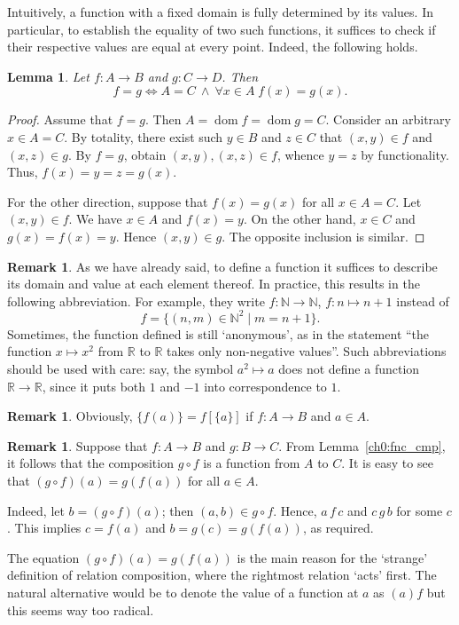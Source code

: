\documentclass[12pt,notitlepage]{article}
\theoremstyle{plain}
\newtheorem{lemma}[thm]{Lemma}
\theoremstyle{definition}
\newtheorem{rem}[thm]{Remark}
\theoremstyle{plain}
\newcommand{\N}{\mathbb{N}}
\newcommand{\R}{\mathbb{R}}
\newcommand{\dom}{\mathop{\mathrm{dom}}}
\newcommand{\1}{\mathbf{1}}
\newcommand{\0}{\mathbf{0}}
\newcommand{\mcomm}[1]{}
\begin{document}
Intuitively, a function with a fixed domain is fully determined by its values. In particular, to establish the equality of two such functions, it suffices to check if their respective values are equal at every point. Indeed, the following holds.
\begin{lemma}\label{ch0:tot_fnc_cmp}
Let $f\colon A \to B$ and $g\colon C \to D$. Then
$$f = g \iff A = C\ \wedge\ \forall x \in A\; f(x) = g(x).$$
\end{lemma}
\begin{proof}
Assume that $f = g$. Then $A = \dom f = \dom g = C$. Consider an arbitrary $x \in A = C$. By totality, there exist such $y \in B$ and $z \in C$ that $(x,y) \in f$ and $(x,z) \in g$. By $f = g$, obtain $(x, y), (x, z) \in f$, whence $y = z$ by functionality. Thus, $f(x) = y = z = g(x)$.

For the other direction, suppose that $f(x) = g(x)$ for all $x \in A = C$. Let $(x,y) \in f$. We have $x \in A$ and $f(x) = y$. On the other hand, $x \in C$ and $g(x) = f(x) = y$. Hence $(x,y) \in g$. The opposite inclusion is similar.
\end{proof}

\begin{rem}
As we have already said, to define a function it suffices to describe its domain and value at each element thereof. In practice, this results in the following abbreviation. For example, they write $f\colon \N \to \N$, $f\colon n \mapsto n + 1$ instead of
$$f = \{(n,m) \in \N^2 \mid m = n + 1 \}.$$
Sometimes, the function defined is still `anonymous', as in the statement ``the function $x \mapsto x^2$ from $\R$ to $\R$ takes only non-negative values''. Such abbreviations should be used with care: say, the symbol  $a^2 \mapsto a$ does not define a function $\R \to \R$, since it puts both $1$ and $-1$ into correspondence to $1$. 
\end{rem}

\begin{rem}
Obviously,  $\{f(a)\} = f[\{a\}]$ if $f\colon A \to B$ and $a \in A$.
\end{rem}

\mcomm{The students may have already defined composition of functions in their calculus course. So, it is important to show them the identity of `our' composition (when restricted to functions) with that of calculus.}
\begin{rem}
Suppose that $f\colon A \to B$ and $g\colon B \to C$. From Lemma~\ref{ch0:fnc_cmp}, it follows that the composition $g \circ f$ is a function from $A$ to $C$. It is easy to see that $(g\circ f)(a) = g(f(a))$ for all $a \in A$.

Indeed, let $b = (g \circ f)(a)$; then $(a, b) \in g \circ f$. Hence, $a\, f\, c$ and $c\, g\, b$ for some $c$. This implies $c = f(a)$ and $b = g(c) = g (f(a))$, as required.

The equation $(g\circ f)(a) = g(f(a))$ is the main reason for the `strange' definition of relation composition, where the rightmost relation `acts' first. The natural alternative would be to denote the value of a function at $a$ as $(a)f$ but this seems way too radical.
\end{rem}
\end{document}
